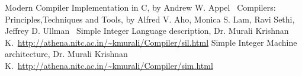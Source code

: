 \cleardoublepage
{}
{}
\begin{thebibliography}{99}

Modern Compiler Implementation in C, by  Andrew W. Appel\ \url{}
Compilers: Principles,Techniques and Tools, by Alfred V. Aho, Monica S. Lam, Ravi Sethi, Jeffrey D. Ullman\ \url{}
Simple Integer Language description, Dr. Murali Krishnan K.\
\url{http://athena.nitc.ac.in/~kmurali/Compiler/sil.html}
Simple Integer Machine architecture, Dr. Murali Krishnan K.\ \url{http://athena.nitc.ac.in/~kmurali/Compiler/sim.html}

\end{thebibliography}
